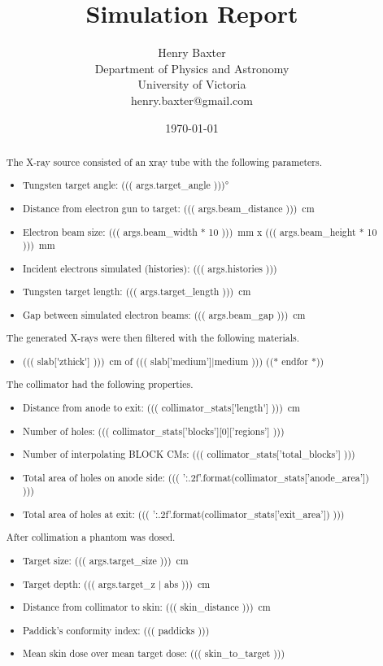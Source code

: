 \documentclass[12pt]{article}
\title{Simulation Report}
\author{
        Henry Baxter \\
                Department of Physics and Astronomy\\
        University of Victoria\\
        henry.baxter@gmail.com
}
\date{\today}
\begin{document}
\maketitle

\begin{abstract}
The X-ray source consisted of an xray tube with the following parameters.
\begin{itemize}
	\item Tungsten target angle: \ang{((( args.target_angle )))}
	\item Distance from electron gun to target: \SI{((( args.beam_distance )))}{\cm}
	\item Electron beam size: \SI{((( args.beam_width * 10 )))}{\mm} x \SI{((( args.beam_height * 10 )))}{\mm}
	\item Incident electrons simulated (histories): ((( args.histories )))
	\item Tungsten target length: \SI{((( args.target_length )))}{\cm}
	\item Gap between simulated electron beams: \SI{((( args.beam_gap )))}{\cm}
\end{itemize}

The generated X-rays were then filtered with the following materials.
\begin{itemize}
	((* for slab in _filter['cms'][0]['slabs'] *))
	\item \SI{((( slab['zthick'] )))}{\cm} of ((( slab['medium']|medium )))
	((* endfor *))
\end{itemize}

The collimator had the following properties.
\begin{itemize}
	\item Distance from anode to exit: \SI{((( collimator_stats['length'] )))}{\cm}
	\item Number of holes: ((( collimator_stats['blocks'][0]['regions'] )))
	\item Number of interpolating BLOCK CMs: ((( collimator_stats['total_blocks'] )))
	\item Total area of holes on anode side: ((( '{:.2f}'.format(collimator_stats['anode_area']) )))
	\item Total area of holes at exit: ((( '{:.2f}'.format(collimator_stats['exit_area']) )))
\end{itemize}

After collimation a phantom was dosed.
\begin{itemize}
	\item Target size: \SI{((( args.target_size )))}{\cm}
	\item Target depth: \SI{((( args.target_z | abs )))}{\cm}
	\item Distance from collimator to skin: \SI{((( skin_distance )))}{\cm}
	\item Paddick's conformity index: ((( paddicks )))
	\item Mean skin dose over mean target dose: ((( skin_to_target )))
\end{itemize}


\end{abstract}
\end{document}

